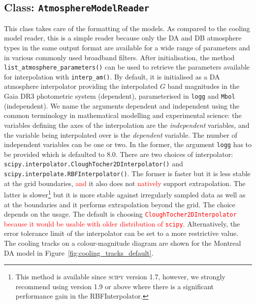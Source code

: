 \documentclass[fleqn,usenatbib]{rasti}
\begin{document}
\subsection{Class: \texttt{AtmosphereModelReader}}
This class takes care of the formatting of the models. As compared to the
cooling model reader, this is a simple reader because only the DA and DB
atmosphere types in the same output format are available for a wide range of
parameters and in various commonly used broadband filters. After initialisation,
the method \verb+list_atmosphere_parameters()+ can be used to retrieve the
parameters available for interpolation with \verb+interp_am()+. By default, it
is initialised as a DA atmosphere interpolator providing the interpolated $G$
band magnitudes in the Gaia DR3 photometric system (dependent), parameterised
in \verb+logg+ and \verb+Mbol+ (independent). We name the arguments dependent
and independent using the common terminology in mathematical modelling and
experimental science: the variables defining the axes of the interpolation are
the \textit{independent} variables, and the variable being interpolated over
is the \textit{dependent} variable. The number of independent variables can be
one or two. In the former, the argument \verb+logg+ has to be provided which
is defaulted to $8.0$. There are two choices of interpolator:
\verb+scipy.interpolator.CloughTocher2DInterpolator()+ and 
\verb+scipy.interpolate.RBFInterpolator()+. The former is faster but it is less
stable at the grid boundaries, \textcolor{red}{and} it also does not \textcolor{red}{natively} support extrapolation. The
latter is slower\footnote{This method is available since \textsc{scipy}
version 1.7, however, we strongly recommend using version 1.9 or above where
there is a significant performance gain in the RBFInterpolator.} but it is more
stable against irregularly sampled data as well as at the boundaries and it
performs extrapolation beyond the grid. The choice depends on the usage. The
default is choosing \textcolor{red}{\verb+CloughTocher2DInterpolator+ because it would be usable with older distribution of \texttt{scipy}}.
Alternatively, the error tolerance limit of the interpolator can be set to a
more restrictive value. The cooling tracks on a colour-magnitude diagram are
shown for the Montreal DA model in Figure~\ref{fig:cooling_tracks_default}.
\end{document}

